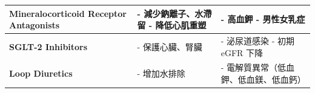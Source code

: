 \documentclass[nols]{tufte-book}
\begin{document}
\begin{longtable}{p{4cm}p{6cm}p{6cm}}
    \textbf{Mineralocorticoid Receptor Antagonists} & 
    - 減少鈉離子、水滯留 \newline
    - 降低心肌重塑 &
    - 高血鉀 \newline
    - 男性女乳症 \\
    \hline

    \textbf{SGLT-2 Inhibitors} & 
    - 保護心臟、腎臟 &
    - 泌尿道感染 \newline
    - 初期 eGFR 下降 \\
    \hline

    \textbf{Loop Diuretics} & 
    - 增加水排除 &
    - 電解質異常（低血鉀、低血鎂、低血鈣） \\
    \hline

\end{longtable}



\end{document}
